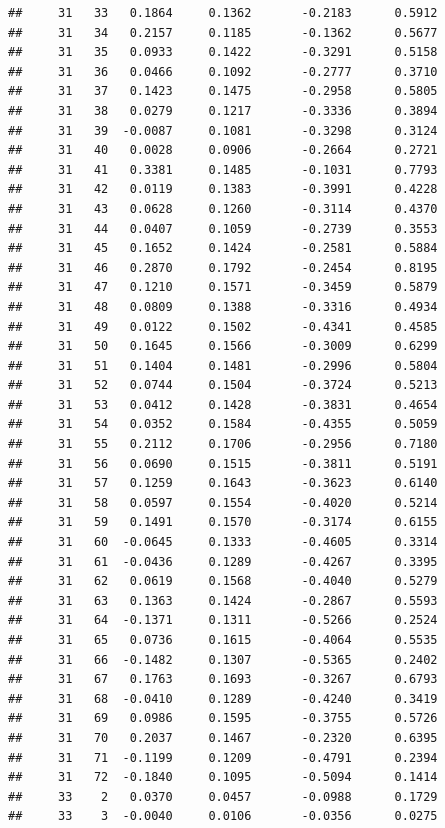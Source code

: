 \documentclass[
]{article}
\begin{document}
\begin{verbatim}
##     31   33   0.1864     0.1362       -0.2183      0.5912  
##     31   34   0.2157     0.1185       -0.1362      0.5677  
##     31   35   0.0933     0.1422       -0.3291      0.5158  
##     31   36   0.0466     0.1092       -0.2777      0.3710  
##     31   37   0.1423     0.1475       -0.2958      0.5805  
##     31   38   0.0279     0.1217       -0.3336      0.3894  
##     31   39  -0.0087     0.1081       -0.3298      0.3124  
##     31   40   0.0028     0.0906       -0.2664      0.2721  
##     31   41   0.3381     0.1485       -0.1031      0.7793  
##     31   42   0.0119     0.1383       -0.3991      0.4228  
##     31   43   0.0628     0.1260       -0.3114      0.4370  
##     31   44   0.0407     0.1059       -0.2739      0.3553  
##     31   45   0.1652     0.1424       -0.2581      0.5884  
##     31   46   0.2870     0.1792       -0.2454      0.8195  
##     31   47   0.1210     0.1571       -0.3459      0.5879  
##     31   48   0.0809     0.1388       -0.3316      0.4934  
##     31   49   0.0122     0.1502       -0.4341      0.4585  
##     31   50   0.1645     0.1566       -0.3009      0.6299  
##     31   51   0.1404     0.1481       -0.2996      0.5804  
##     31   52   0.0744     0.1504       -0.3724      0.5213  
##     31   53   0.0412     0.1428       -0.3831      0.4654  
##     31   54   0.0352     0.1584       -0.4355      0.5059  
##     31   55   0.2112     0.1706       -0.2956      0.7180  
##     31   56   0.0690     0.1515       -0.3811      0.5191  
##     31   57   0.1259     0.1643       -0.3623      0.6140  
##     31   58   0.0597     0.1554       -0.4020      0.5214  
##     31   59   0.1491     0.1570       -0.3174      0.6155  
##     31   60  -0.0645     0.1333       -0.4605      0.3314  
##     31   61  -0.0436     0.1289       -0.4267      0.3395  
##     31   62   0.0619     0.1568       -0.4040      0.5279  
##     31   63   0.1363     0.1424       -0.2867      0.5593  
##     31   64  -0.1371     0.1311       -0.5266      0.2524  
##     31   65   0.0736     0.1615       -0.4064      0.5535  
##     31   66  -0.1482     0.1307       -0.5365      0.2402  
##     31   67   0.1763     0.1693       -0.3267      0.6793  
##     31   68  -0.0410     0.1289       -0.4240      0.3419  
##     31   69   0.0986     0.1595       -0.3755      0.5726  
##     31   70   0.2037     0.1467       -0.2320      0.6395  
##     31   71  -0.1199     0.1209       -0.4791      0.2394  
##     31   72  -0.1840     0.1095       -0.5094      0.1414  
##     33    2   0.0370     0.0457       -0.0988      0.1729  
##     33    3  -0.0040     0.0106       -0.0356      0.0275  

\end{verbatim}
\end{document}
